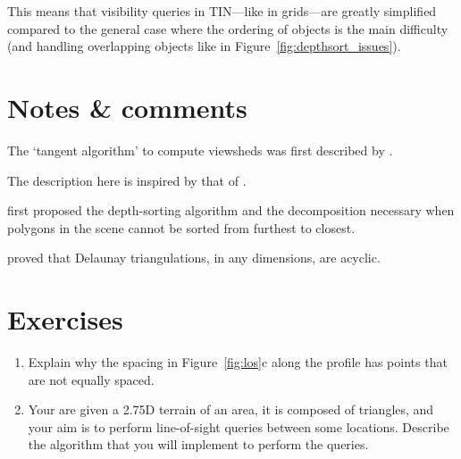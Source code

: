 %

This means that visibility queries in TIN---like in grids---are greatly simplified compared to the general case where the ordering of objects is the main difficulty (and handling overlapping objects like in Figure~\ref{fig:depthsort_issues}).



%
\section{Notes \& comments}

The `tangent algorithm' to compute viewsheds was first described by \citet{Blelloch90}.

The description here is inspired by that of \citet{DeFloriani99-1}.

\citet{Newell72} first proposed the depth-sorting algorithm and the decomposition necessary when polygons in the scene cannot be sorted from furthest to closest.

\citet{Edelsbrunner90} proved that Delaunay triangulations, in any dimensions, are acyclic.

%
\section{Exercises}

\begin{enumerate}
  \item Explain why the spacing in Figure~\ref{fig:los}c along the profile has points that are not equally spaced.
  \item Your are given a 2.75D terrain of an area, it is composed of triangles, and your aim is to perform line-of-sight queries between some locations. Describe the algorithm that you will implement to perform the queries.
\end{enumerate}
